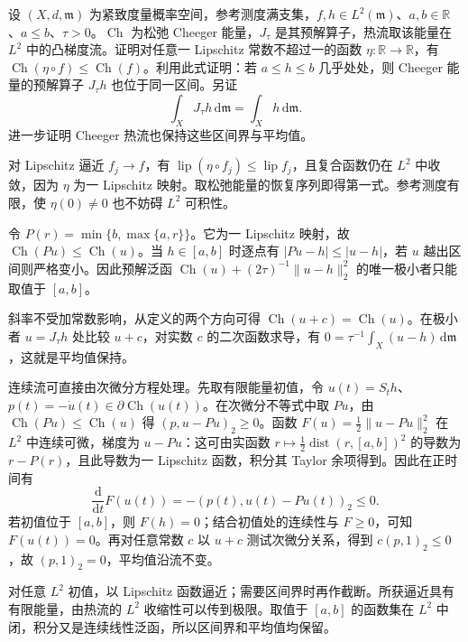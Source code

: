 \begin{exercise}\label{g3:ex:C-resolvent-bounds-mean}
	设 \((X,d,\mathfrak m)\) 为紧致度量概率空间，参考测度满支集，\(f,h\in L^2(\mathfrak m)\)、\(a,b\in\mathbb R\)、\(a\le b\)、\(\tau>0\)。\(\operatorname{Ch}\) 为松弛 Cheeger 能量，\(J_\tau\) 是其预解算子，热流取该能量在 \(L^2\) 中的凸梯度流。证明对任意一 Lipschitz 常数不超过一的函数 \(\eta:\mathbb R\to\mathbb R\)，有 \(\operatorname{Ch}(\eta\circ f)\le\operatorname{Ch}(f)\)。利用此式证明：若 \(a\le h\le b\) 几乎处处，则 Cheeger 能量的预解算子 \(J_\tau h\) 也位于同一区间。另证
	\[
		\int_XJ_\tau h\,\mathrm d\mathfrak m=\int_Xh\,\mathrm d\mathfrak m.
	\]
	进一步证明 Cheeger 热流也保持这些区间界与平均值。
\end{exercise}
\begin{solution}
	对 Lipschitz 逼近 \(f_j\to f\)，有
	\(\operatorname{lip}(\eta\circ f_j)\le\operatorname{lip}f_j\)，且复合函数仍在 \(L^2\) 中收敛，因为 \(\eta\) 为一 Lipschitz 映射。取松弛能量的恢复序列即得第一式。参考测度有限，使 \(\eta(0)\ne0\) 也不妨碍 \(L^2\) 可积性。

	令 \(P(r)=\min\{b,\max\{a,r\}\}\)。它为一 Lipschitz 映射，故 \(\operatorname{Ch}(Pu)\le\operatorname{Ch}(u)\)。当 \(h\in[a,b]\) 时逐点有 \(|Pu-h|\le|u-h|\)，若 \(u\) 越出区间则严格变小。因此预解泛函
	\(\operatorname{Ch}(u)+(2\tau)^{-1}\|u-h\|_2^2\)
	的唯一极小者只能取值于 \([a,b]\)。

	斜率不受加常数影响，从定义的两个方向可得 \(\operatorname{Ch}(u+c)=\operatorname{Ch}(u)\)。在极小者 \(u=J_\tau h\) 处比较 \(u+c\)，对实数 \(c\) 的二次函数求导，有
	\(0=\tau^{-1}\int_X(u-h)\,\mathrm d\mathfrak m\)，这就是平均值保持。

	连续流可直接由次微分方程处理。先取有限能量初值，令 \(u(t)=S_th\)、\(p(t)=-\dot u(t)\in\partial\operatorname{Ch}(u(t))\)。在次微分不等式中取 \(Pu\)，由 \(\operatorname{Ch}(Pu)\le\operatorname{Ch}(u)\) 得
	\((p,u-Pu)_2\ge0\)。函数
	\(F(u)=\tfrac12\|u-Pu\|_2^2\)
	在 \(L^2\) 中连续可微，梯度为 \(u-Pu\)：这可由实函数 \(r\mapsto\tfrac12\operatorname{dist}(r,[a,b])^2\) 的导数为 \(r-P(r)\)，且此导数为一 Lipschitz 函数，积分其 Taylor 余项得到。因此在正时间有
	\[
		\frac{\mathrm d}{\mathrm dt}F(u(t))=-(p(t),u(t)-Pu(t))_2\le0.
	\]
	若初值位于 \([a,b]\)，则 \(F(h)=0\)；结合初值处的连续性与 \(F\ge0\)，可知 \(F(u(t))=0\)。再对任意常数 \(c\) 以 \(u+c\) 测试次微分关系，得到 \(c(p,1)_2\le0\)，故 \((p,1)_2=0\)，平均值沿流不变。

	对任意 \(L^2\) 初值，以 Lipschitz 函数逼近；需要区间界时再作截断。所获逼近具有有限能量，由热流的 \(L^2\) 收缩性可以传到极限。取值于 \([a,b]\) 的函数集在 \(L^2\) 中闭，积分又是连续线性泛函，所以区间界和平均值均保留。
\end{solution}

